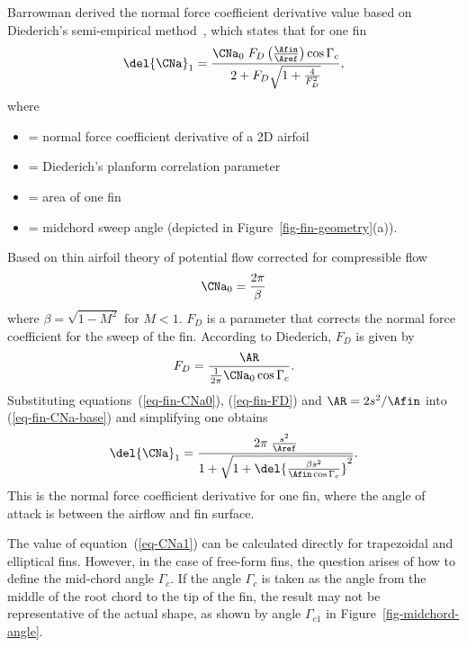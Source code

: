 Barrowman derived the normal force coefficient derivative value based
on Diederich's semi-empirical method~\cite{diederich}, which states that
for one fin
%
\begin{equation}
\del{\CNa}_1 = \frac{\CNa_0\; F_D \left(\frac{\Afin}{\Aref}\right)
                     \cos\Gamma_c}
             {2+F_D\sqrt{1+\frac{4}{F_D^2}}},
\label{eq-fin-CNa-base}
\end{equation}
%
where
%
\begin{itemize}
\item[$\CNa_0$] = normal force coefficient derivative of a 2D airfoil
\item[$F_D$] = Diederich's planform correlation parameter
\item[$\Afin$] = area of one fin
\item[$\Gamma_c$] = midchord sweep angle (depicted in
  Figure~\ref{fig-fin-geometry}(a)).
\end{itemize}
%
Based on thin airfoil theory of potential flow corrected for
compressible flow
%
\begin{equation}
\CNa_0 = \frac{2\pi}{\beta}
\label{eq-fin-CNa0}
\end{equation}
%
where $\beta=\sqrt{1-M^2}$ for $M<1$.  $F_D$ is a parameter that
corrects the normal force coefficient for the sweep of the fin.
According to Diederich, $F_D$ is given by
%
\begin{equation}
F_D=\frac{\AR}{\frac{1}{2\pi}\CNa_0\cos\Gamma_c}.
\label{eq-fin-FD}
\end{equation}
%
Substituting equations~(\ref{eq-fin-CNa0}), (\ref{eq-fin-FD}) and 
$\AR=2s^2/\Afin$ into (\ref{eq-fin-CNa-base}) and simplifying one
obtains
%
\begin{equation}
\del{\CNa}_1 = \frac{2\pi\; \frac{s^2}{\Aref}}
             {1+\sqrt{1 + \del{\frac{\beta s^2}{\Afin\cos\Gamma_c}}^2}}.
\label{eq-CNa1}
\end{equation}
%
This is the normal force coefficient derivative for one fin, where the
angle of attack is between the airflow and fin surface.

The value of equation~(\ref{eq-CNa1}) can be calculated directly for
trapezoidal and elliptical fins.  However, in the case of free-form
fins, the question arises of how to define the mid-chord angle
$\Gamma_c$.  If the angle $\Gamma_c$ is taken as the angle from the
middle of the root chord to the tip of the fin, the result may not be
representative of the actual shape, as shown by angle $\Gamma_{c1}$ in
Figure~\ref{fig-midchord-angle}.

